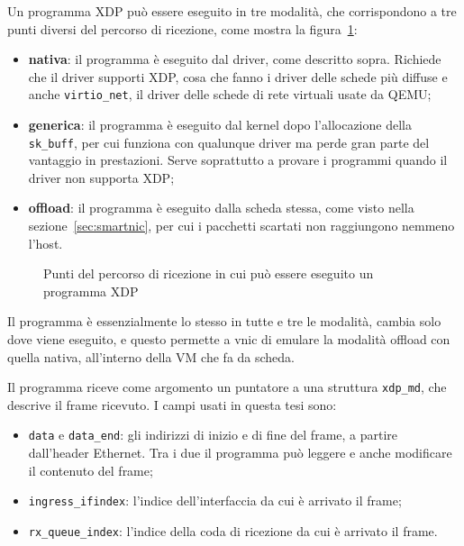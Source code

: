 Un programma XDP può essere eseguito in tre modalità, che corrispondono a tre punti diversi del percorso di ricezione, come mostra la figura~\ref{fig:xdp-modalita}:
\begin{itemize}
    \item \textbf{nativa}: il programma è eseguito dal driver, come descritto sopra. Richiede che il driver supporti XDP, cosa che fanno i driver delle schede più diffuse e anche \texttt{virtio\_net}, il driver delle schede di rete virtuali usate da QEMU;
    \item \textbf{generica}: il programma è eseguito dal kernel dopo l'allocazione della \texttt{sk\_buff}, per cui funziona con qualunque driver ma perde gran parte del vantaggio in prestazioni. Serve soprattutto a provare i programmi quando il driver non supporta XDP;
    \item \textbf{offload}: il programma è eseguito dalla scheda stessa, come visto nella sezione~\ref{sec:smartnic}, per cui i pacchetti scartati non raggiungono nemmeno l'host.
\end{itemize}

\begin{figure}[H]
    \centering
    
    \caption{Punti del percorso di ricezione in cui può essere eseguito un programma XDP}
    \label{fig:xdp-modalita}
\end{figure}

Il programma è essenzialmente lo stesso in tutte e tre le modalità, cambia solo dove viene eseguito, e questo permette a vnic di emulare la modalità offload con quella nativa, all'interno della VM che fa da scheda.

Il programma riceve come argomento un puntatore a una struttura \texttt{xdp\_md}, che descrive il frame ricevuto. I campi usati in questa tesi sono:
\begin{itemize}
    \item \texttt{data} e \texttt{data\_end}: gli indirizzi di inizio e di fine del frame, a partire dall'header Ethernet. Tra i due il programma può leggere e anche modificare il contenuto del frame;
    \item \texttt{ingress\_ifindex}: l'indice dell'interfaccia da cui è arrivato il frame;
    \item \texttt{rx\_queue\_index}: l'indice della coda di ricezione da cui è arrivato il frame.
\end{itemize}


